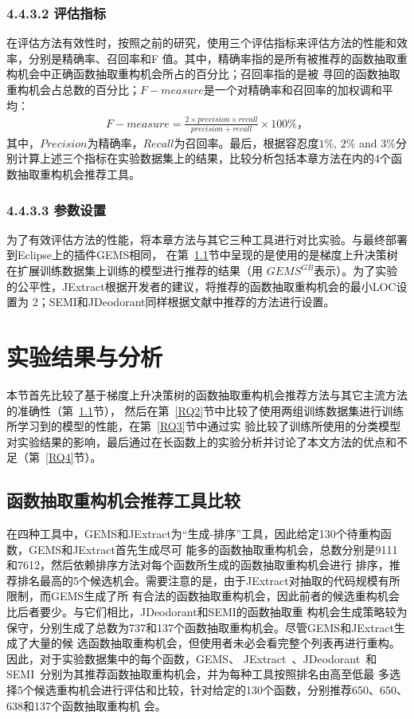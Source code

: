\subsubsection{4.4.3.2 评估指标}
在评估方法有效性时，按照之前的研究，使用三个评估指标来评估方法的性能和效率，分别是精确率、召回率和F
值。其中，精确率指的是所有被推荐的函数抽取重构机会中正确函数抽取重构机会所占的百分比；召回率指的是被
寻回的函数抽取重构机会占总数的百分比；$F-measure$是一个对精确率和召回率的加权调和平均：
\begin{eqnarray}
  F-measure = \frac{2 \times precision \times recall}{precision + recall} \times 100\%，
\end{eqnarray}
\label{f1}
其中，$Precision$为精确率，$Recall$为召回率。最后，根据容忍度$1\%$, $2\%$ and $3\%$分别计算上述三个指标在实验数据集上的结果，比较分析包括本章方法在内的4个函数抽取重构机会推荐工具。

\subsubsection{4.4.3.3 参数设置}
为了有效评估方法的性能，将本章方法与其它三种工具进行对比实验。与最终部署到Eclipse上的插件GEMS相同，
在第~\ref{RQ1}节中呈现的是使用的是梯度上升决策树在扩展训练数据集上训练的模型进行推荐的结果（用
$GEMS^{GB}$表示）。为了实验的公平性，JExtract根据开发者的建议，将推荐的函数抽取重构机会的最小LOC设置为
2；SEMI和JDeodorant同样根据文献中推荐的方法进行设置。

\section{实验结果与分析}
本节首先比较了基于梯度上升决策树的函数抽取重构机会推荐方法与其它主流方法的准确性（第~\ref{RQ1}节），
然后在第~\ref{RQ2}节中比较了使用两组训练数据集进行训练所学习到的模型的性能，在第~\ref{RQ3}节中通过实
验比较了训练所使用的分类模型对实验结果的影响，最后通过在长函数上的实验分析并讨论了本文方法的优点和不
足（第~\ref{RQ4}节）。

\subsection{函数抽取重构机会推荐工具比较}\label{RQ1}
在四种工具中，GEMS和JExtract为``生成-排序''工具，因此给定130个待重构函数，GEMS和JExtract首先生成尽可
能多的函数抽取重构机会，总数分别是9111和7612，然后依赖排序方法对每个函数所生成的函数抽取重构机会进行
排序，推荐排名最高的5个候选机会。需要注意的是，由于JExtract对抽取的代码规模有所限制，而GEMS生成了所
有合法的函数抽取重构机会，因此前者的候选重构机会比后者要少。与它们相比，JDeodorant和SEMI的函数抽取重
构机会生成策略较为保守，分别生成了总数为737和137个函数抽取重构机会。尽管GEMS和JExtract生成了大量的候
选函数抽取重构机会，但使用者未必会看完整个列表再进行重构。因此，对于实验数据集中的每个函数，GEMS、
JExtract~\cite{silva:ICPC14}、JDeodorant~\cite{tsantalis2011identification}和
SEMI~\cite{charalampidou2016identifying}分别为其推荐函数抽取重构机会，并为每种工具按照排名由高至低最
多选择5个候选重构机会进行评估和比较，针对给定的130个函数，分别推荐650、650、638和137个函数抽取重构机
会。

